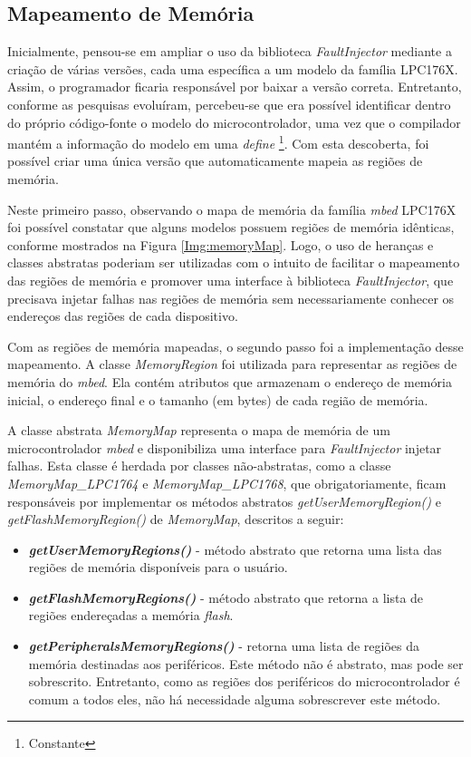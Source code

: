 \subsection{Mapeamento de Memória} \label{subsec:MapDeMemoria}

Inicialmente, pensou-se em ampliar o uso da biblioteca \textit{FaultInjector} mediante a criação de várias versões, cada uma específica a um modelo da família LPC176X. Assim, o programador ficaria responsável por baixar a versão correta. Entretanto, conforme as pesquisas evoluíram, percebeu-se que era possível identificar dentro do próprio código-fonte o modelo do microcontrolador, uma vez que o compilador mantém a informação do modelo em uma \textit{define} \footnote{Constante}. Com esta descoberta, foi possível criar uma única versão que automaticamente mapeia as regiões de memória.

Neste primeiro passo, observando o mapa de memória da família \textit{mbed} LPC176X \cite{manualLpc176x:2016} foi possível constatar que alguns modelos possuem regiões de memória idênticas, conforme mostrados na Figura \ref{Img:memoryMap}. Logo, o uso de heranças e classes abstratas poderiam ser utilizadas com o intuito de facilitar o mapeamento das regiões de memória e promover uma interface à biblioteca \textit{FaultInjector}, que precisava injetar falhas nas regiões de memória sem necessariamente conhecer os endereços das regiões de cada dispositivo.

Com as regiões de memória mapeadas, o segundo passo foi a implementação desse mapeamento. A classe \textit{MemoryRegion}\cite{Kruger:2014} foi utilizada para representar as regiões de memória do \textit{mbed}. Ela contém atributos que armazenam o endereço de memória inicial, o endereço final e o tamanho (em bytes) de cada região de memória. 

A classe abstrata \textit{MemoryMap} representa o mapa de memória de um microcontrolador \textit{mbed} e disponibiliza uma interface para \textit{FaultInjector} injetar falhas. Esta classe é herdada por classes não-abstratas, como a classe \textit{MemoryMap\_LPC1764} e \textit{MemoryMap\_LPC1768}, que obrigatoriamente, ficam responsáveis por implementar os métodos abstratos \textit{getUserMemoryRegion()} e \textit{getFlashMemoryRegion()} de \textit{MemoryMap}, descritos a seguir:

\begin{itemize}
	\item \textbf{\textit{getUserMemoryRegions()}} - método abstrato que retorna uma lista das regiões de memória disponíveis para o usuário.				
	
	\item \textbf{\textit{getFlashMemoryRegions()}} - método abstrato que retorna a lista de regiões endereçadas a memória \textit{flash}.
	
	\item \textbf{\textit{getPeripheralsMemoryRegions()}} - retorna uma lista de regiões da memória destinadas aos periféricos. Este método não é abstrato, mas pode ser sobrescrito. Entretanto, como as regiões dos periféricos do microcontrolador é comum a todos eles, não há necessidade alguma sobrescrever este método.
\end{itemize}

